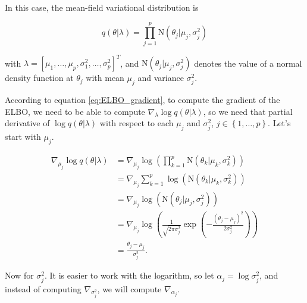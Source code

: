 In this case, the mean-field variational distribution is

\begin{equation}
  \label{eq:mean_field_normal_prior}
  q(\theta | \lambda) = \prod_{j = 1}^p \mathrm{N}(\theta_j | \mu_j, \sigma_j^2)
 \end{equation}

with $\lambda = \left[ \mu_1, \hdots, \mu_p, \sigma_1^2, \hdots, \sigma_p^2 \right]^T$, and $\mathrm{N}(\theta_j | \mu_j, \sigma_j^2)$ denotes the value of a normal density function at $\theta_j$ with mean $\mu_j$ and variance $\sigma_j^2$.

According to equation \ref{eq:ELBO_gradient}, to compute the gradient of the ELBO, we need to be able to compute $\nabla_{\lambda} \log q(\theta | \lambda)$, so we need that partial derivative of $\log q(\theta | \lambda)$ with respect to each $\mu_j$ and $\sigma_j^2$, $j \in \left\{ 1, \hdots, p \right\}$. Let's start with $\mu_j$.

\begin{equation*}
  \begin{split}
      \nabla_{\mu_j} \log q(\theta | \lambda) & =
      \nabla_{\mu_j} \log \left( \prod_{ k = 1}^p \mathrm{N} \left( \theta_k | \mu_k, \sigma_k^2 \right) \right) \\
      &= \nabla_{\mu_j} \sum_{ k = 1}^p \log \left( \mathrm{N} \left( \theta_k | \mu_k, \sigma_k^2 \right) \right) \\
      &= \nabla_{\mu_j} \log \left( \mathrm{N} \left( \theta_j | \mu_j, \sigma_j^2 \right) \right) \\
      &= \nabla_{\mu_j} \log \left( \frac{1}{\sqrt{2 \pi \sigma_j^2}} \exp \left( -\frac{(\theta_j - \mu_j)^2}{2 \sigma_j^2} \right) \right) \\
      &= \frac{\theta_j - \mu_j}{\sigma_j^2}.
  \end{split}
\end{equation*}

Now for $\sigma_j^2$. It is easier to work with the logarithm, so let $\alpha_j = \log \sigma_j^2$, and instead of computing $\nabla_{\sigma_j^2}$, we will compute $\nabla_{\alpha_j}$.


